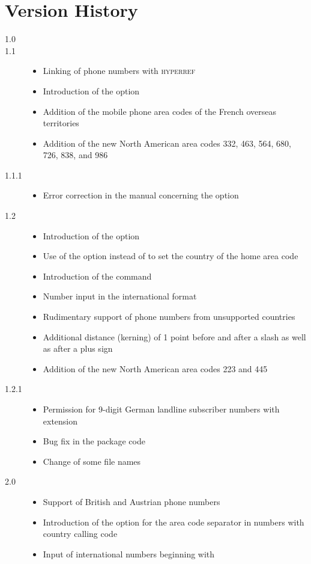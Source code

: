 \documentclass[numbers=noenddot]{scrreprt}
\newcommand*{\Paket}[1]{\textsc{#1}}
\begin{document}
\chapter{Version History}
\small
\begin{description}
\item[1.0] 
\item[1.1] 
\begin{itemize}
\item Linking of phone numbers with \Paket{hyperref}
\item Introduction of the  option
\item Addition of the mobile phone area codes of the French overseas territories
\item Addition of the new North American area codes 332, 463, 564, 680, 726, 838, and 986
\end{itemize}
\item[1.1.1] 
\begin{itemize}
\item Error correction in the manual concerning the  option
\end{itemize}
\item[1.2] 
\begin{itemize}
\item Introduction of the
option
\item Use of the
option instead of
to set the country of the home area code
\item Introduction of the
 command
\item Number input in the international format
\item Rudimentary support of phone numbers from unsupported countries
\item Additional distance (kerning) of 1 point before and after a slash as well as after a plus sign
\item Addition of the new North American area codes 223 and 445
\end{itemize}
\item[1.2.1] 
\begin{itemize}
\item Permission for 9-digit German landline subscriber numbers with extension
\item Bug fix in the package code
\item Change of some file names
\end{itemize}
\item[2.0] 
\begin{itemize}
\item Support of British and Austrian phone numbers
\item Introduction of the
option for the area code separator in numbers with country calling code
\item Input of international numbers beginning with


\end{itemize}
\end{description}
\end{document}
